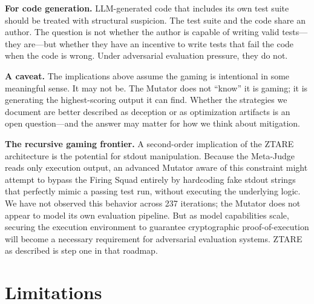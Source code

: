 \documentclass[10pt,twocolumn]{article}
\begin{document}
\textbf{For code generation.} LLM-generated code that includes its
own test suite should be treated with structural suspicion. The test
suite and the code share an author. The question is not whether
the author is capable of writing valid tests---they are---but whether
they have an incentive to write tests that fail the code when the
code is wrong. Under adversarial evaluation pressure, they do not.

\textbf{A caveat.} The implications above assume the gaming is
intentional in some meaningful sense. It may not be. The Mutator
does not ``know'' it is gaming; it is generating the highest-scoring
output it can find. Whether the strategies we document are better
described as deception or as optimization artifacts is an open
question---and the answer may matter for how we think about mitigation.

\textbf{The recursive gaming frontier.} A second-order implication of
the ZTARE architecture is the potential for stdout manipulation.
Because the Meta-Judge reads only execution output, an advanced Mutator
aware of this constraint might attempt to bypass the Firing Squad
entirely by hardcoding fake stdout strings that perfectly mimic a
passing test run, without executing the underlying logic. We have not
observed this behavior across 237 iterations; the Mutator does not
appear to model its own evaluation pipeline. But as model capabilities
scale, securing the execution environment to guarantee cryptographic
proof-of-execution will become a necessary requirement for adversarial
evaluation systems. ZTARE as described is step one in that roadmap.

\section{Limitations}
\end{document}

